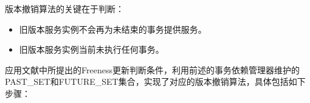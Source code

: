\documentclass[macfonts,master]{njuthesis}
\begin{document}
版本撤销算法的关键在于判断：

\begin{itemize}
	\item 旧版本服务实例不会再为未结束的事务提供服务。
	\item 旧版本服务实例当前未执行任何事务。
\end{itemize}


应用文献\cite{ma2011version}中所提出的Freeness更新判断条件，利用前述的事务依赖管理器维护的PAST\_SET和FUTURE\_SET集合，实现了对应的版本撤销算法，具体包括如下步骤：
\end{document}
